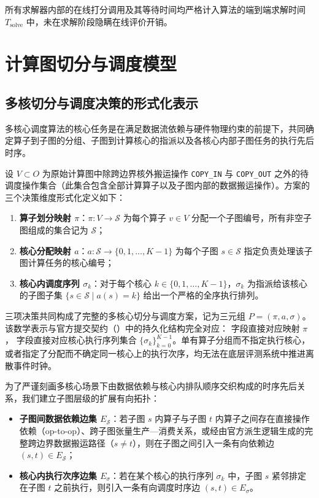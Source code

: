 \documentclass[anonymous,notoc]{gmcm2026}
\providecommand{\tightlist}{\setlength{\itemsep}{0pt}\setlength{\parskip}{0pt}}
\begin{document}
所有求解器内部的在线打分调用及其等待时间均严格计入算法的端到端求解时间 \(T_{\text{solve}}\) 中，未在求解阶段隐瞒在线评价开销。


\section{计算图切分与调度模型}

\subsection{多核切分与调度决策的形式化表示}

多核心调度算法的核心任务是在满足数据流依赖与硬件物理约束的前提下，共同确定算子到子图的分组、子图到计算核心的指派以及各核心内部子图任务的执行先后时序。

设 \(V \subset O\) 为原始计算图中除跨边界核外搬运操作 \texttt{COPY\_IN} 与 \texttt{COPY\_OUT} 之外的待调度操作集合（此集合包含全部计算算子以及子图内部的数据搬运操作）。方案的三个决策维度形式化定义如下：

\begin{enumerate}
\def\labelenumi{\arabic{enumi}.}
\tightlist
\item
  \textbf{算子划分映射 \(\pi\)}：\(\pi: V \to \mathcal{S}\) 为每个算子 \(v \in V\) 分配一个子图编号，所有非空子图组成的集合记为 \(\mathcal{S}\)；
\item
  \textbf{核心分配映射 \(a\)}：\(a: \mathcal{S} \to \{0, 1, \dots, K-1\}\) 为每个子图 \(s \in \mathcal{S}\) 指定负责处理该子图计算任务的核心编号；
\item
  \textbf{核心内调度序列 \(\sigma_k\)}：对于每个核心 \(k \in \{0, 1, \dots, K-1\}\)，\(\sigma_k\) 为指派给该核心的子图子集 \(\{s \in \mathcal{S} \mid a(s) = k\}\) 给出一个严格的全序执行排列。
\end{enumerate}

三项决策共同构成了完整的多核心切分与调度方案，记为三元组 \(P = (\pi, a, \sigma)\)。该数学表示与官方提交契约（\texttt{}）中的持久化结构完全对应：\texttt{} 字段直接对应映射 \(\pi\)，\texttt{} 字段直接对应核心执行序列集合 \(\{\sigma_k\}_{k=0}^{K-1}\)。单有算子分组而不指定执行核心，或者指定了分配而不确定同一核心上的执行次序，均无法在底层评测系统中推进离散事件时钟。

为了严谨刻画多核心场景下由数据依赖与核心内排队顺序交织构成的时序先后关系，我们建立子图层级的扩展有向拓扑：

\begin{itemize}
\tightlist
\item
  \textbf{子图间数据依赖边集 \(E_{\mathcal{S}}\)}：若子图 \(s\) 内算子与子图 \(t\) 内算子之间存在直接操作依赖（op-to-op）、跨子图张量生产---消费关系，或经由官方派生逻辑生成的完整跨边界数据搬运路径（\(s \ne t\)），则在子图之间引入一条有向依赖边 \((s, t) \in E_{\mathcal{S}}\)；
\item
  \textbf{核心内执行次序边集 \(E_\sigma\)}：若在某个核心的执行序列 \(\sigma_k\) 中，子图 \(s\) 紧邻排定在子图 \(t\) 之前执行，则引入一条有向调度时序边 \((s, t) \in E_\sigma\)。
\end{itemize}
\end{document}
